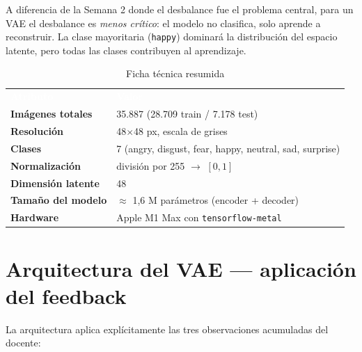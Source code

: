 \documentclass[10pt,a4paper,twocolumn]{article}
\begin{document}
A diferencia de la Semana 2 donde el desbalance fue el problema central, para un VAE el desbalance es \textit{menos crítico}: el modelo no clasifica, solo aprende a reconstruir. La clase mayoritaria (\texttt{happy}) dominará la distribución del espacio latente, pero todas las clases contribuyen al aprendizaje.

\begin{table}[H]
\centering
\caption{Ficha técnica resumida}
\label{tab:ficha}
\small
\renewcommand{\arraystretch}{1.15}
\begin{tabularx}{\columnwidth}{>{\bfseries}lX}
\rowcolor{tableheader}\textcolor{white}{\textbf{Atributo}} & \textcolor{white}{\textbf{Valor}}\\
Imágenes totales        & 35.887 (28.709 train / 7.178 test)\\
Resolución              & 48$\times$48 px, escala de grises\\
Clases                  & 7 (angry, disgust, fear, happy, neutral, sad, surprise)\\
Normalización           & división por 255 $\rightarrow$ $[0, 1]$\\
Dimensión latente       & 48\\
Tamaño del modelo       & $\approx$ 1,6 M parámetros (encoder + decoder)\\
Hardware                & Apple M1 Max con \texttt{tensorflow-metal}\\
\end{tabularx}
\end{table}

\section{Arquitectura del VAE — aplicación del feedback}

La arquitectura aplica explícitamente las tres observaciones acumuladas del docente:
\end{document}
